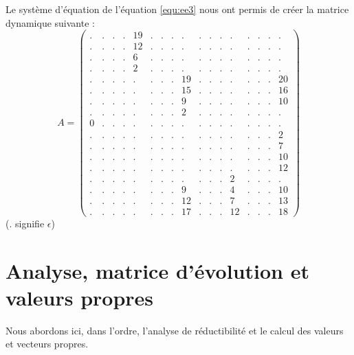 Le système d'équation de l'équation \ref{equ:ee3} nous ont permis de créer la matrice dynamique suivante : 
\begin{equation}
A = \left(\begin{array}{ccccccccccccccccc}
.&.&.&.&19&.&.&.&.& .&.&.&.& .&.&.&. \\
.&.&.&.&12&.&.&.&.& .&.&.&.& .&.&.&. \\
.&.&.&.&6& .&.&.&.& .&.&.&.& .&.&.&. \\
.&.&.&.&2& .&.&.&.& .&.&.&.& .&.&.&. \\
.&.&.&.&.& .&.&.&19&.&.&.&.& .&.&.&20\\
.&.&.&.&.& .&.&.&15&.&.&.&.& .&.&.&16\\
.&.&.&.&.& .&.&.&9& .&.&.&.& .&.&.&10\\
.&.&.&.&.& .&.&.&2& .&.&.&.& .&.&.&.\\
0&.&.&.&.& .&.&.&.& .&.&.&.& .&.&.&. \\
.&.&.&.&.& .&.&.&.& .&.&.&.& .&.&.&2 \\
.&.&.&.&.& .&.&.&.& .&.&.&.& .&.&.&7 \\
.&.&.&.&.& .&.&.&.& .&.&.&.& .&.&.&10\\
.&.&.&.&.& .&.&.&.& .&.&.&.& .&.&.&12\\
.&.&.&.&.& .&.&.&.& .&.&.&2& .&.&.&. \\
.&.&.&.&.& .&.&.&9& .&.&.&4& .&.&.&10 \\
.&.&.&.&.& .&.&.&12&.&.&.&7& .&.&.&13\\
.&.&.&.&.& .&.&.&17&.&.&.&12&.&.&.&18
\end{array}\right)
\end{equation}
($.$ signifie $\epsilon$)
\section{Analyse, matrice d'évolution et valeurs propres}
Nous abordons ici, dans l'ordre, l'analyse de réductibilité et le calcul des valeurs et vecteurs propres. 

